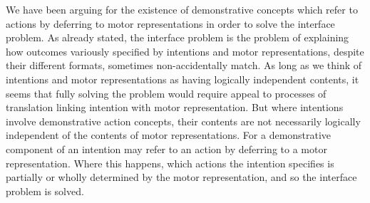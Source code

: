 \documentclass[12pt,\papersize]{extarticle}
\begin{document}
We have been arguing for the existence of demonstrative concepts which refer to actions by deferring to motor representations in order to solve the interface problem. As already stated, the interface problem is the problem of explaining how outcomes variously specified by intentions and motor representations, despite their different formats, sometimes non-accidentally match. As long as we think of intentions and motor representations as having logically independent contents, it seems that fully solving the problem would require appeal to processes of translation linking intention with motor representation. But where intentions involve demonstrative action concepts, their contents are not necessarily logically independent of the contents of motor representations. For a demonstrative component of an intention may refer to an action by deferring to a motor representation. Where this happens, which actions the intention specifies is partially or wholly determined by the motor representation, and so the interface problem is solved.
\end{document}
